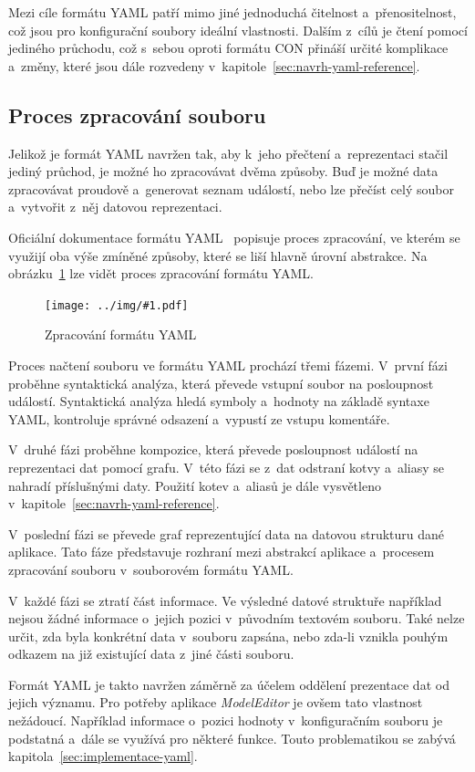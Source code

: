 \documentclass[FM,bw,DP]{tulthesis}
\newcommand{\includeimg}[2]{%
\begin{figure}[h]
	\centering
    \texttt{[image: ../img/\#1.pdf]}
    \caption{#2}
	\label{img:#1}
\end{figure}
}
\begin{document}
Mezi cíle formátu \gls{YAML} patří mimo jiné jednoduchá čitelnost a~přenositelnost, což jsou pro konfigurační soubory ideální vlastnosti. Dalším z~cílů je čtení pomocí jediného průchodu, což s~sebou oproti formátu \gls{CON} přináší určité komplikace a~změny, které jsou dále rozvedeny v~kapitole~\ref{sec:navrh-yaml-reference}.

\subsection{Proces zpracování souboru}

Jelikož je formát \gls{YAML} navržen tak, aby k~jeho přečtení a~reprezentaci stačil jediný průchod, je možné ho zpracovávat dvěma způsoby. Buď je možné data zpracovávat proudově a~generovat seznam událostí, nebo lze přečíst celý soubor a~vytvořit z~něj datovou reprezentaci.

Oficiální dokumentace formátu \gls{YAML}~\cite{bib:yaml} popisuje proces zpracování, ve kterém se využijí oba výše zmíněné způsoby, které se liší hlavně úrovní abstrakce. Na obrázku~\ref{img:yaml} lze vidět proces zpracování formátu \gls{YAML}.

\includeimg{yaml}{Zpracování formátu YAML}

Proces načtení souboru ve formátu \gls{YAML} prochází třemi fázemi. V~první fázi proběhne syntaktická analýza, která převede vstupní soubor na posloupnost událostí. Syntaktická analýza hledá symboly a~hodnoty na základě syntaxe \gls{YAML}, kontroluje správné odsazení a~vypustí ze vstupu komentáře.

V~druhé fázi proběhne kompozice, která převede posloupnost událostí na reprezentaci dat pomocí grafu. V~této fázi se z~dat odstraní kotvy a~aliasy se nahradí příslušnými daty. Použití kotev a~aliasů je dále vysvětleno v~kapitole~\ref{sec:navrh-yaml-reference}.

V~poslední fázi se převede graf reprezentující data na datovou strukturu dané aplikace. Tato fáze představuje rozhraní mezi abstrakcí aplikace a~procesem zpracování souboru v~souborovém formátu \gls{YAML}.

V~každé fázi se ztratí část informace. Ve výsledné datové struktuře například nejsou žádné informace o~jejich pozici v~původním textovém souboru. Také nelze určit, zda byla konkrétní data v~souboru zapsána, nebo zda-li vznikla pouhým odkazem na již existující data z~jiné části souboru.

Formát \gls{YAML} je takto navržen záměrně za účelem oddělení prezentace dat od jejich významu. Pro potřeby aplikace \textit{ModelEditor} je ovšem tato vlastnost nežádoucí. Například informace o~pozici hodnoty v~konfiguračním souboru je podstatná a~dále se využívá pro některé funkce. Touto problematikou se zabývá kapitola~\ref{sec:implementace-yaml}.
\end{document}
